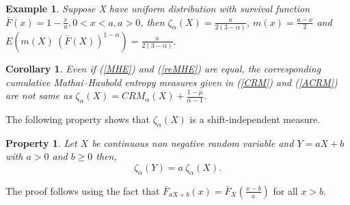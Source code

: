 \documentclass[11pt,reqno]{amsart}
\theoremstyle{tight}
\newtheorem{example}{Example}[section]
\newtheorem{corollary}{Corollary}[section]
\newtheorem{property}{Property}[section]
\begin{document}
\begin{example}
    Suppose X have uniform distribution with survival function $\bar{F}(x)=1-\frac{x}{a}, 0<x<a,a>0$, then $\zeta_{\alpha}(X)= \frac{a}{2(3-\alpha)}$, $m(x)=\frac{a-x}{2}$ and $E(m(X)~(\bar{F}(X))^{1-\alpha})=\frac{a}{2(3-\alpha)}.$
\end{example}
\begin{corollary}
    Even if (\ref{MHE}) and (\ref{reMHE}) are equal, the corresponding cumulative Mathai--Haubold entropy measures given in (\ref{CRM}) and  (\ref{ACRM}) are not same as $\zeta_{\alpha}(X)= CRM_{\alpha}(X)+\frac{1-\mu}{\alpha-1}$.
\end{corollary}
The following property shows that $\zeta_{\alpha}(X)$ is a shift-independent measure.
\begin{property}
 Let $X$ be continuous non negative random variable and  $Y=a X+b$ with $a>0$ and $b \geq 0$ then,
$$
\zeta_{\alpha}(Y)=a~\zeta_{\alpha}(X).
$$
\end{property}


  The proof follows using the fact that $\bar{F}_{a X+b}(x)=\bar{F}_{X}\left(\frac{x-b}{a}\right)$ for all $x>b$.

\end{document}
